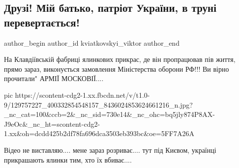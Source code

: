  
 
 
 
 
 
\subsection{Друзі! Мій батько, патріот України, в труні перевертається!}
\label{sec:04_12_2020.fb.kviatkovskyi_viktor.1.igrushki_armia_rossii}
\ifcmt
	author_begin
   author_id kviatkovskyi_viktor
	author_end
\fi

На Клавдіївській фабриці ялинкових прикрас, де він пропрацював пів життя, прямо
зараз, виконується замовлення Міністерства оборони РФ!!! Ви вірно прочитали"
АРМІЇ МОСКОВІЇ.... 

\ifcmt
pic https://scontent-cdg2-1.xx.fbcdn.net/v/t1.0-9/129757227_400332854548157_8436024853624661216_n.jpg?_nc_cat=100&ccb=2&_nc_sid=730e14&_nc_ohc=bq5jly874P8AX-J9eOc&_nc_ht=scontent-cdg2-1.xx&oh=dcdd425b2df78fa696dca3503eb393bc&oe=5FF7A26A
\fi

Відео не виставляю.... мене зараз розриває.... тут під Києвом, українці
прикрашають ялинки тим, хто їх вбиває....
